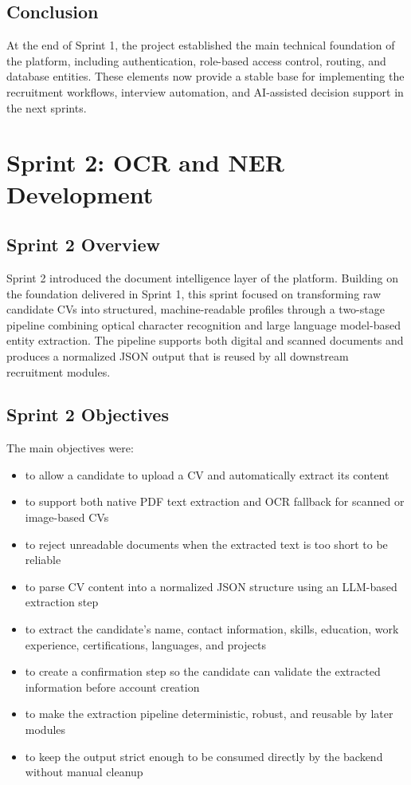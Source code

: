 \subsection{Conclusion}
At the end of Sprint 1, the project established the main technical foundation of the platform, including authentication, role-based access control, routing, and database entities. These elements now provide a stable base for implementing the recruitment workflows, interview automation, and AI-assisted decision support in the next sprints.

\section{Sprint 2: OCR and NER Development} \label{chap4:sec2}

\subsection{Sprint 2 Overview}

Sprint 2 introduced the document intelligence layer of the platform. Building on the foundation delivered in Sprint 1, this sprint focused on transforming raw candidate CVs into structured, machine-readable profiles through a two-stage pipeline combining optical character recognition and large language model-based entity extraction. The pipeline supports both digital and scanned documents and produces a normalized JSON output that is reused by all downstream recruitment modules.

\subsection{Sprint 2 Objectives}
\label{sec:sprint2:objectives}

The main objectives were:
\begin{itemize}
    \item to allow a candidate to upload a CV and automatically extract its content
    \item to support both native PDF text extraction and OCR fallback for scanned or image-based CVs
    \item to reject unreadable documents when the extracted text is too short to be reliable
    \item to parse CV content into a normalized JSON structure using an LLM-based extraction step
    \item to extract the candidate's name, contact information, skills, education, work experience, certifications, languages, and projects
    \item to create a confirmation step so the candidate can validate the extracted information before account creation
    \item to make the extraction pipeline deterministic, robust, and reusable by later modules
    \item to keep the output strict enough to be consumed directly by the backend without manual cleanup
\end{itemize}


